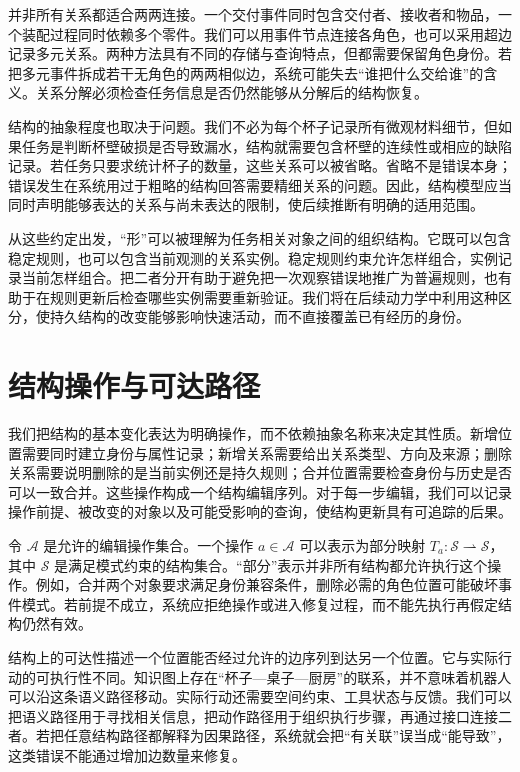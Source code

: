 并非所有关系都适合两两连接。一个交付事件同时包含交付者、接收者和物品，一个装配过程同时依赖多个零件。我们可以用事件节点连接各角色，也可以采用超边记录多元关系。两种方法具有不同的存储与查询特点，但都需要保留角色身份。若把多元事件拆成若干无角色的两两相似边，系统可能失去“谁把什么交给谁”的含义。关系分解必须检查任务信息是否仍然能够从分解后的结构恢复。

结构的抽象程度也取决于问题。我们不必为每个杯子记录所有微观材料细节，但如果任务是判断杯壁破损是否导致漏水，结构就需要包含杯壁的连续性或相应的缺陷记录。若任务只要求统计杯子的数量，这些关系可以被省略。省略不是错误本身；错误发生在系统用过于粗略的结构回答需要精细关系的问题。因此，结构模型应当同时声明能够表达的关系与尚未表达的限制，使后续推断有明确的适用范围。

从这些约定出发，“形”可以被理解为任务相关对象之间的组织结构。它既可以包含稳定规则，也可以包含当前观测的关系实例。稳定规则约束允许怎样组合，实例记录当前怎样组合。把二者分开有助于避免把一次观察错误地推广为普遍规则，也有助于在规则更新后检查哪些实例需要重新验证。我们将在后续动力学中利用这种区分，使持久结构的改变能够影响快速活动，而不直接覆盖已有经历的身份。

\section{结构操作与可达路径}
\label{sec:s_elements}

我们把结构的基本变化表达为明确操作，而不依赖抽象名称来决定其性质。新增位置需要同时建立身份与属性记录；新增关系需要给出关系类型、方向及来源；删除关系需要说明删除的是当前实例还是持久规则；合并位置需要检查身份与历史是否可以一致合并。这些操作构成一个结构编辑序列。对于每一步编辑，我们可以记录操作前提、被改变的对象以及可能受影响的查询，使结构更新具有可追踪的后果。

令 $\mathcal{A}$ 是允许的编辑操作集合。一个操作 $a\in\mathcal{A}$ 可以表示为部分映射 $T_a:\mathcal{S}\rightharpoonup\mathcal{S}$，其中 $\mathcal{S}$ 是满足模式约束的结构集合。“部分”表示并非所有结构都允许执行这个操作。例如，合并两个对象要求满足身份兼容条件，删除必需的角色位置可能破坏事件模式。若前提不成立，系统应拒绝操作或进入修复过程，而不能先执行再假定结构仍然有效。

结构上的可达性描述一个位置能否经过允许的边序列到达另一个位置。它与实际行动的可执行性不同。知识图上存在“杯子—桌子—厨房”的联系，并不意味着机器人可以沿这条语义路径移动。实际行动还需要空间约束、工具状态与反馈。我们可以把语义路径用于寻找相关信息，把动作路径用于组织执行步骤，再通过接口连接二者。若把任意结构路径都解释为因果路径，系统就会把“有关联”误当成“能导致”，这类错误不能通过增加边数量来修复。

